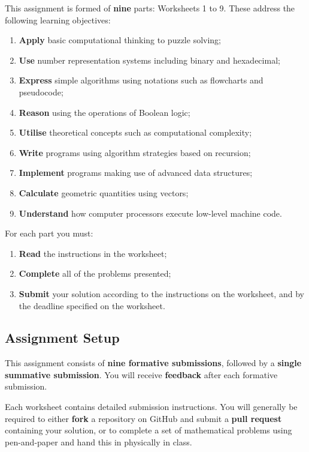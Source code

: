 \documentclass{../../fal_assignment}
\begin{document}
This assignment is formed of \textbf{nine} parts: Worksheets 1 to 9.
These address the following learning objectives:
\begin{enumerate}
	\item \textbf{Apply} basic computational thinking to puzzle solving;
	\item \textbf{Use} number representation systems including binary and hexadecimal;
	\item \textbf{Express} simple algorithms using notations such as flowcharts and pseudocode;
	\item \textbf{Reason} using the operations of Boolean logic;
	\item \textbf{Utilise} theoretical concepts such as computational complexity;
	\item \textbf{Write} programs using algorithm strategies based on recursion;
	\item \textbf{Implement} programs making use of advanced data structures;
	\item \textbf{Calculate} geometric quantities using vectors;
	\item \textbf{Understand} how computer processors execute low-level machine code.
\end{enumerate}

For each part you must:
\begin{enumerate}[label=(\roman*)]
    \item \textbf{Read} the instructions in the worksheet;
    \item \textbf{Complete} all of the problems presented;
    \item \textbf{Submit} your solution according to the instructions on the worksheet, and by the deadline specified on the worksheet.
\end{enumerate}

\subsection*{Assignment Setup} 

This assignment consists of \textbf{nine formative submissions}, followed by a \textbf{single summative submission}.
You will receive \textbf{feedback} after each formative submission.

Each worksheet contains detailed submission instructions. You will generally be required to either \textbf{fork} a repository on GitHub and submit a \textbf{pull request} containing your solution, or to complete a set of mathematical problems using pen-and-paper and hand this in physically in class.
\end{document}
